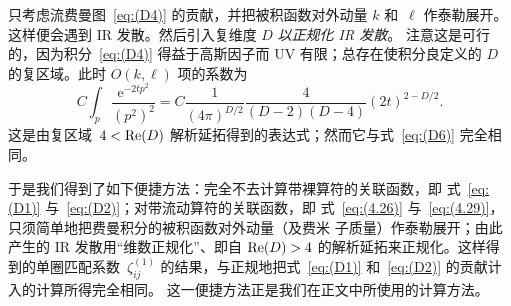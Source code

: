 只考虑流费曼图~\eqref{eq:(D4)} 的贡献，并把被积函数对外动量 $k$
和~$\ell$ 作泰勒展开。这样便会遇到 IR 发散。然后引入复维度 $D$ \emph{以正规化 IR 发散}。
注意这是可行的，因为积分~\eqref{eq:(D4)} 得益于高斯因子而 UV 有限；总存在使积分良定义的
$D$ 的复区域。此时 $O(k,\ell)$ 项的系数为
\begin{equation}
   C\int_p\frac{\mathrm{e}^{-2tp^2}}{(p^2)^2}
   =C\frac{1}{(4\pi)^{D/2}}\frac{4}{(D-2)(D-4)}(2t)^{2-D/2}.
\label{eq:(D7)}
\end{equation}
这是由复区域~$4<\operatorname{Re}(D)$ 解析延拓得到的表达式；然而它与式~\eqref{eq:(D6)}
完全相同。

于是我们得到了如下便捷方法：完全不去计算带裸算符的关联函数，即
式~\eqref{eq:(D1)} 与~\eqref{eq:(D2)}；对带流动算符的关联函数，即
式~\eqref{eq:(4.26)} 与~\eqref{eq:(4.29)}，只须简单地把费曼积分的被积函数对外动量（及费米
子质量）作泰勒展开；由此产生的 IR 发散用“维数正规化”、即自 $\operatorname{Re}(D)>4$
的解析延拓来正规化。这样得到的单圈匹配系数~$\zeta_{ij}^{(1)}$
的结果，与正规地把式~\eqref{eq:(D1)} 和~\eqref{eq:(D2)} 的贡献计入的计算所得完全相同。
这一便捷方法正是我们在正文中所使用的计算方法。


